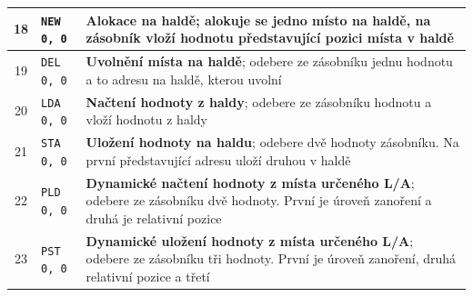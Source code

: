 \documentclass[
12pt,
a4paper,
pdftex,
czech,
titlepage
]{report}
\begin{document}
\begin{longtable}{|c|l|p{10cm}|}
\rule{0pt}{3ex} 18 & \texttt{NEW 0, 0} &  \textbf{Alokace na haldě}; alokuje se jedno místo na haldě, na zásobník vloží hodnotu představující pozici místa v haldě \\ \hline
\rule{0pt}{3ex} 19 & \texttt{DEL 0, 0} & \textbf{Uvolnění místa na haldě}; odebere ze zásobníku jednu hodnotu a to adresu na haldě, kterou uvolní \\ \hline
\rule{0pt}{3ex} 20 & \texttt{LDA 0, 0} & \textbf{Načtení hodnoty z haldy}; odebere ze zásobníku hodnotu a vloží hodnotu z haldy \\ \hline
\rule{0pt}{3ex} 21 & \texttt{STA 0, 0} & \textbf{Uložení hodnoty na haldu}; odebere dvě hodnoty zásobníku. Na první představující adresu uloží druhou v haldě \\ \hline
\rule{0pt}{3ex} 22 & \texttt{PLD 0, 0} & \textbf{Dynamické načtení hodnoty z místa určeného L/A}; odebere ze zásobníku dvě hodnoty. První je úroveň zanoření a druhá je relativní pozice \\ \hline
\rule{0pt}{3ex} 23 & \texttt{PST 0, 0} & \textbf{Dynamické uložení hodnoty z místa určeného L/A}; odebere ze zásobníku tři hodnoty. První je úroveň zanoření, druhá relativní pozice a třetí \\ \hline
\end{longtable}
\end{document}
